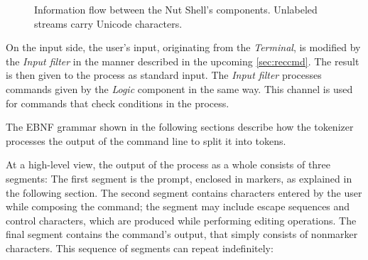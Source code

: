 \documentclass[paper=a4,twoside,abstract=on,cleardoublepage=empty,numbers=noenddot,toc=bib,12pt,appendixprefix=true]{scrreprt}
\begin{document}
\begin{figure}[htb]
    \centering
    \caption{Information flow between the Nut Shell's components. Unlabeled streams carry Unicode characters.}
    \label{fig:architecture}
\end{figure}

On the input side, the user's input, originating from the \emph{Terminal}, is modified by the \emph{Input filter} in the manner described in the upcoming \cref{sec:reccmd}. The result is then given to the process as standard input. The \emph{Input filter} processes commands given by the \emph{Logic} component in the same way. This channel is used for commands that check conditions in the process.

The \textsc{EBNF} grammar shown in the following sections describe how the tokenizer processes the output of the command line to split it into tokens.

At a high-level view, the output of the process as a whole consists of three segments:
The first segment is the prompt, enclosed in markers, as explained in the following section.
The second segment contains characters entered by the user while composing the command; the segment may include escape sequences and control characters, which are produced while performing editing operations.
The final segment contains the command's output, that simply consists of nonmarker characters.
This sequence of segments can repeat indefinitely:
\end{document}
